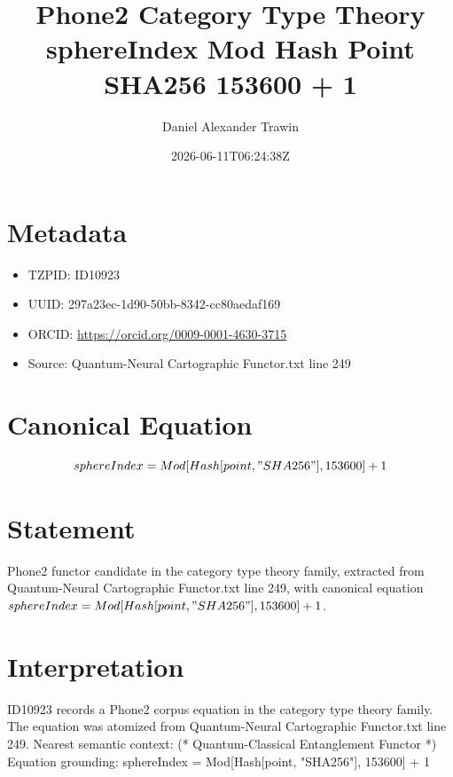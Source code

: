 \documentclass[11pt]{article}
\title{Phone2 Category Type Theory sphereIndex Mod Hash Point SHA256 153600 + 1}
\author{Daniel Alexander Trawin}
\date{2026-06-11T06:24:38Z}
\begin{document}
\maketitle
\section*{Metadata}
\begin{itemize}
\item TZPID: ID10923
\item UUID: 297a23ec-1d90-50bb-8342-cc80aedaf169
\item ORCID: \url{https://orcid.org/0009-0001-4630-3715}
\item Source: Quantum-Neural Cartographic Functor.txt line 249
\end{itemize}
\section*{Canonical Equation}
\[
sphereIndex = Mod[Hash[point, "SHA256"], 153600] + 1
\]
\section*{Statement}
Phone2 functor candidate in the category type theory family, extracted from Quantum-Neural Cartographic Functor.txt line 249, with canonical equation $sphereIndex = Mod[Hash[point, "SHA256"], 153600] + 1$.
\section*{Interpretation}
ID10923 records a Phone2 corpus equation in the category type theory family. The equation was atomized from Quantum-Neural Cartographic Functor.txt line 249. Nearest semantic context: (* Quantum-Classical Entanglement Functor *) Equation grounding: sphereIndex = Mod[Hash[point, "SHA256"], 153600] + 1
\end{document}
